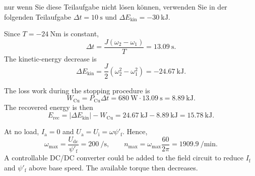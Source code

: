 \begin{germanhintblock}
	nur wenn Sie diese Teilaufgabe nicht lösen können, verwenden Sie in der
	folgenden Teilaufgabe $\Delta t=\SI{10}{\second}$ und
	$\Delta E_{\mathrm{kin}}=\SI{-30}{\kilo\joule}$.
\end{germanhintblock}

\begin{solutionblock}
	Since $T=\SI{-24}{\newton\metre}$ is constant,
	\begin{equation*}
		\Delta t=\frac{J(\omega_2-\omega_1)}{T}
		=\SI{13.09}{\second}.
	\end{equation*}
	The kinetic-energy decrease is
	\begin{equation*}
		\Delta E_{\mathrm{kin}}
		=\frac{J}{2}\left(\omega_2^2-\omega_1^2\right)
		=\SI{-24.67}{\kilo\joule}.
	\end{equation*}
\end{solutionblock}

\begin{solutionblock}
	The loss work during the stopping procedure is
	\begin{equation*}
		W_{\mathrm{Cu}}=P_{\mathrm{Cu}}\Delta t
		=\SI{680}{\watt}\cdot\SI{13.09}{\second}
		=\SI{8.89}{\kilo\joule}.
	\end{equation*}
	The recovered energy is then
	\begin{equation*}
		E_{\mathrm{rec}}=|\Delta E_{\mathrm{kin}}|-W_{\mathrm{Cu}}
		=\SI{24.67}{\kilo\joule}-\SI{8.89}{\kilo\joule}
		=\SI{15.78}{\kilo\joule}.
	\end{equation*}
\end{solutionblock}


\begin{solutionblock}
	At no load, $I_{\mathrm{a}}=0$ and
	$U_{\mathrm{a}}=U_{\mathrm{i}}=\omega\psi'_{\mathrm{f}}$. Hence,
	\begin{equation*}
		\omega_{\mathrm{max}}=\frac{U_{\mathrm{dc}}}{\psi'_{\mathrm{f}}}
		=\SI{200}{\per\second},
		\qquad
		n_{\mathrm{max}}=\omega_{\mathrm{max}}\frac{60}{2\pi}
		=\SI{1909.9}{\per\minute}.
	\end{equation*}
	A controllable DC/DC converter could be added to the field circuit to reduce $I_{\mathrm{f}}$ and
	$\psi'_{\mathrm{f}}$ above base speed. The available torque then decreases.
\end{solutionblock}
